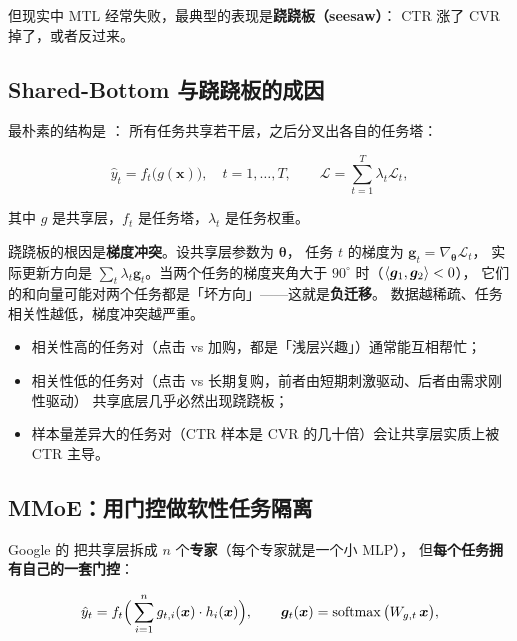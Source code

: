 但现实中 MTL 经常失败，最典型的表现是\textbf{跷跷板（seesaw）}：
CTR 涨了 CVR 掉了，或者反过来。

\subsection{Shared-Bottom 与跷跷板的成因}

最朴素的结构是 ：
所有任务共享若干层，之后分叉出各自的任务塔：

\begin{equation}
\hat{y}_t = f_t\big( g(\bm{x}) \big), \quad t = 1, \dots, T,
\qquad
\mathcal{L} = \sum_{t=1}^{T} \lambda_t \mathcal{L}_t ,
\label{eq:shared-bottom}
\end{equation}

其中 $g$ 是共享层，$f_t$ 是任务塔，$\lambda_t$ 是任务权重。

跷跷板的根因是\textbf{梯度冲突}。设共享层参数为 $\bm{\theta}$，
任务 $t$ 的梯度为 $\bm{g}_t = \nabla_{\bm{\theta}} \mathcal{L}_t$，
实际更新方向是 $\sum_t \lambda_t \bm{g}_t$。当两个任务的梯度夹角大于 $90^\circ$ 时（$\left\langle \bm{g}_1, \bm{g}_2 \right\rangle < 0$），
它们的和向量可能对两个任务都是「坏方向」——这就是\textbf{负迁移}。
数据越稀疏、任务相关性越低，梯度冲突越严重。

\begin{itemize}
  \item 相关性高的任务对（点击 vs 加购，都是「浅层兴趣」）通常能互相帮忙；
  \item 相关性低的任务对（点击 vs 长期复购，前者由短期刺激驱动、后者由需求刚性驱动）
        共享底层几乎必然出现跷跷板；
  \item 样本量差异大的任务对（CTR 样本是 CVR 的几十倍）会让共享层实质上被 CTR 主导。
\end{itemize}

\subsection{MMoE：用门控做软性任务隔离}

Google 的  \cite{ma2018mmoe}
把共享层拆成 $n$ 个\textbf{专家}（每个专家就是一个小 MLP），
但\textbf{每个任务拥有自己的一套门控}：

\begin{equation}
\hat{y}_t = f_t\Big( \sum_{i=1}^{n} g_{t,i}(\bm{x}) \cdot h_i(\bm{x}) \Big),
\qquad
\bm{g}_t(\bm{x}) = \operatorname{softmax}\big( W_{g,t} \, \bm{x} \big),
\label{eq:mmoe}
\end{equation}

